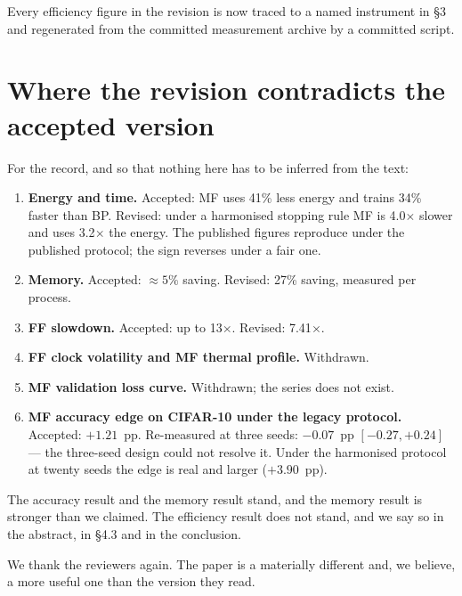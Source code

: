 \documentclass[11pt,a4paper]{article}
\newcommand{\FF}{FF}
\newcommand{\MF}{MF}
\newcommand{\BP}{BP}
\begin{document}
Every efficiency figure in the revision is now traced to a named instrument in
\S3 and regenerated from the committed measurement archive by a committed
script.

\section*{Where the revision contradicts the accepted version}

For the record, and so that nothing here has to be inferred from the text:

\begin{enumerate}[nosep,leftmargin=1.6em]
  \item \textbf{Energy and time.} Accepted: \MF{} uses \num{41}\% less energy
        and trains \num{34}\% faster than \BP{}. Revised: under a harmonised
        stopping rule \MF{} is \num{4.0}$\times$ slower and uses
        \num{3.2}$\times$ the energy. The published figures reproduce under
        the published protocol; the sign reverses under a fair one.
  \item \textbf{Memory.} Accepted: ${\approx}\num{5}\%$ saving. Revised:
        \num{27}\% saving, measured per process.
  \item \textbf{\FF{} slowdown.} Accepted: up to \num{13}$\times$. Revised:
        \num{7.41}$\times$.
  \item \textbf{\FF{} clock volatility and \MF{} thermal profile.} Withdrawn.
  \item \textbf{\MF{} validation loss curve.} Withdrawn; the series does not
        exist.
  \item \textbf{\MF{} accuracy edge on CIFAR-10 under the legacy protocol.}
        Accepted: $+\num{1.21}$~pp. Re-measured at three seeds:
        $-\num{0.07}$~pp $[-\num{0.27}, +\num{0.24}]$ --- the three-seed design
        could not resolve it. Under the harmonised protocol at twenty seeds
        the edge is real and larger ($+\num{3.90}$~pp).
\end{enumerate}

\noindent
The accuracy result and the memory result stand, and the memory result is
stronger than we claimed. The efficiency result does not stand, and we say so
in the abstract, in \S4.3 and in the conclusion.

\bigskip
\noindent
We thank the reviewers again. The paper is a materially different and, we
believe, a more useful one than the version they read.
\end{document}
